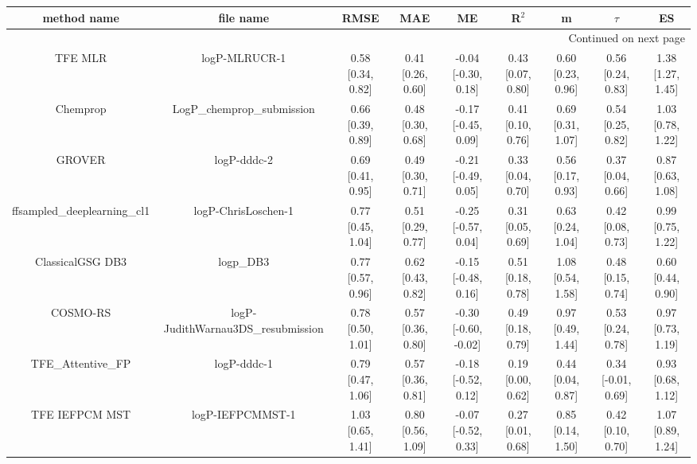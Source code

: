 \documentclass{article}
\begin{document}
\begin{center}
\scriptsize
\begin{longtable}{|ccccccccc|}
\toprule
                method name &                                   file name &               RMSE &                MAE &                    ME &              R$^2$ &                     m &                $\tau$ &                    ES \\
\midrule
\endhead
\midrule
\multicolumn{9}{r}{{Continued on next page}} \\
\midrule
\endfoot

\bottomrule
\endlastfoot
                    TFE MLR &                               logP-MLRUCR-1 &  0.58 [0.34, 0.82] &  0.41 [0.26, 0.60] &   -0.04 [-0.30, 0.18] &  0.43 [0.07, 0.80] &     0.60 [0.23, 0.96] &     0.56 [0.24, 0.83] &     1.38 [1.27, 1.45] \\
                   Chemprop &                  LogP\_chemprop\_submission &  0.66 [0.39, 0.89] &  0.48 [0.30, 0.68] &   -0.17 [-0.45, 0.09] &  0.41 [0.10, 0.76] &     0.69 [0.31, 1.07] &     0.54 [0.25, 0.82] &     1.03 [0.78, 1.22] \\
                     GROVER &                                 logP-dddc-2 &  0.69 [0.41, 0.95] &  0.49 [0.30, 0.71] &   -0.21 [-0.49, 0.05] &  0.33 [0.04, 0.70] &     0.56 [0.17, 0.93] &     0.37 [0.04, 0.66] &     0.87 [0.63, 1.08] \\
 ffsampled_deeplearning_cl1 &                         logP-ChrisLoschen-1 &  0.77 [0.45, 1.04] &  0.51 [0.29, 0.77] &   -0.25 [-0.57, 0.04] &  0.31 [0.05, 0.69] &     0.63 [0.24, 1.04] &     0.42 [0.08, 0.73] &     0.99 [0.75, 1.22] \\
           ClassicalGSG DB3 &                                   logp\_DB3 &  0.77 [0.57, 0.96] &  0.62 [0.43, 0.82] &   -0.15 [-0.48, 0.16] &  0.51 [0.18, 0.78] &     1.08 [0.54, 1.58] &     0.48 [0.15, 0.74] &     0.60 [0.44, 0.90] \\
                   COSMO-RS &          logP-JudithWarnau3DS\_resubmission &  0.78 [0.50, 1.01] &  0.57 [0.36, 0.80] &  -0.30 [-0.60, -0.02] &  0.49 [0.18, 0.79] &     0.97 [0.49, 1.44] &     0.53 [0.24, 0.78] &     0.97 [0.73, 1.19] \\
           TFE_Attentive_FP &                                 logP-dddc-1 &  0.79 [0.47, 1.06] &  0.57 [0.36, 0.81] &   -0.18 [-0.52, 0.12] &  0.19 [0.00, 0.62] &     0.44 [0.04, 0.87] &    0.34 [-0.01, 0.69] &     0.93 [0.68, 1.12] \\
             TFE IEFPCM MST &                            logP-IEFPCMMST-1 &  1.03 [0.65, 1.41] &  0.80 [0.56, 1.09] &   -0.07 [-0.52, 0.33] &  0.27 [0.01, 0.68] &     0.85 [0.14, 1.50] &     0.42 [0.10, 0.70] &     1.07 [0.89, 1.24] \\

\end{longtable}
\end{center}
\end{document}
